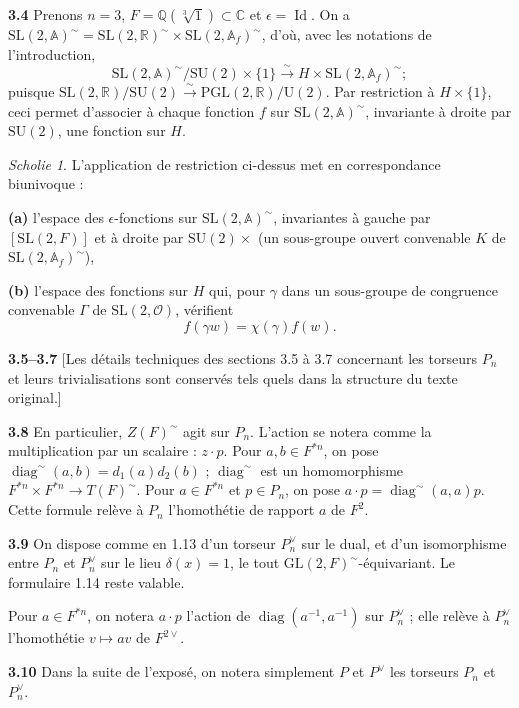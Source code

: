 \documentclass[12pt,a4paper]{article}
\theoremstyle{plain}
\theoremstyle{definition}
\theoremstyle{remark}
\newtheorem{scholie}[theorem]{Scholie}
\DeclareMathOperator{\diag}{diag}
\DeclareMathOperator{\id}{Id}
\newcommand{\CC}{\mathbb{C}}
\newcommand{\RR}{\mathbb{R}}
\newcommand{\QQ}{\mathbb{Q}}
\newcommand{\Af}{\mathbb{A}}
\newcommand{\cO}{\mathcal{O}}
\providecommand{\CC}{\mathbb{C}}
\providecommand{\QQ}{\mathbb{Q}}
\providecommand{\RR}{\mathbb{R}}
\providecommand{\cO}{\mathcal{O}}
\begin{document}
\textbf{3.4} Prenons $n = 3$, $F = \QQ(\sqrt[3]{1}) \subset \CC$ et $\epsilon = \id$. On a $\mathrm{SL}(2, \Af)^\sim = \mathrm{SL}(2, \RR)^\sim \times \mathrm{SL}(2, \Af_f)^\sim$, d'où, avec les notations de l'introduction,
\[
\mathrm{SL}(2, \Af)^\sim / \mathrm{SU}(2) \times \{1\} \xrightarrow{\sim} H \times \mathrm{SL}(2, \Af_f)^\sim;
\]
puisque $\mathrm{SL}(2, \RR) / \mathrm{SU}(2) \xrightarrow{\sim} \mathrm{PGL}(2, \RR) / \mathrm{U}(2)$. Par restriction à $H \times \{1\}$, ceci permet d'associer à chaque fonction $f$ sur $\mathrm{SL}(2, \Af)^\sim$, invariante à droite par $\mathrm{SU}(2)$, une fonction sur $H$.

\begin{scholie}
L'application de restriction ci-dessus met en correspondance biunivoque :

\textbf{(a)} l'espace des $\epsilon$-fonctions sur $\mathrm{SL}(2, \Af)^\sim$, invariantes à gauche par $[\mathrm{SL}(2, F)]$ et à droite par $\mathrm{SU}(2) \times$ (un sous-groupe ouvert convenable $K$ de $\mathrm{SL}(2, \Af_f)^\sim$),

\textbf{(b)} l'espace des fonctions sur $H$ qui, pour $\gamma$ dans un sous-groupe de congruence convenable $\Gamma$ de $\mathrm{SL}(2, \cO)$, vérifient
\[
f(\gamma w) = \chi(\gamma) f(w).
\]
\end{scholie}

\textbf{3.5--3.7} [Les détails techniques des sections 3.5 à 3.7 concernant les torseurs $P_n$ et leurs trivialisations sont conservés tels quels dans la structure du texte original.]

\textbf{3.8} En particulier, $Z(F)^\sim$ agit sur $P_n$. L'action se notera comme la multiplication par un scalaire : $z \cdot p$. Pour $a, b \in F^{*n}$, on pose $\diag^\sim(a, b) = d_1(a) d_2(b)$ ; $\diag^\sim$ est un homomorphisme $F^{*n} \times F^{*n} \to T(F)^\sim$. Pour $a \in F^{*n}$ et $p \in P_n$, on pose $a \cdot p = \diag^\sim(a, a) p$. Cette formule relève à $P_n$ l'homothétie de rapport $a$ de $F^2$.

\textbf{3.9} On dispose comme en 1.13 d'un torseur $P_n^\vee$ sur le dual, et d'un isomorphisme entre $P_n$ et $P_n^\vee$ sur le lieu $\delta(x) = 1$, le tout $\mathrm{GL}(2, F)^\sim$-équivariant. Le formulaire 1.14 reste valable.

Pour $a \in F^{*n}$, on notera $a \cdot p$ l'action de $\diag(a^{-1}, a^{-1})$ sur $P_n^\vee$ ; elle relève à $P_n^\vee$ l'homothétie $v \mapsto av$ de $F^{2\vee}$.

\textbf{3.10} Dans la suite de l'exposé, on notera simplement $P$ et $P^\vee$ les torseurs $P_n$ et $P_n^\vee$.
\end{document}
